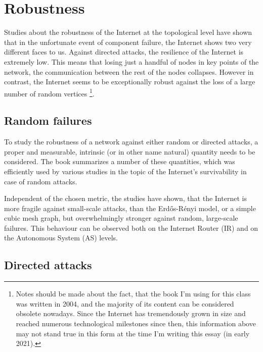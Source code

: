 \section{Robustness}
Studies about the robustness of the Internet at the topological level have shown that in the unfortunate event of component failure, the Internet shows two very different faces to us. Against directed attacks, the resilience of the Internet is extremely low. This means that losing just a handful of nodes in key points of the network, the communication between the rest of the nodes collapses. However in contrast, the Internet seems to be exceptionally robust against the loss of a large number of random vertices \footnote{Notes should be made about the fact, that the book I'm using for this class was written in 2004, and the majority of its content can be considered obsolete nowadays. Since the Internet has tremendously grown in size and reached numerous technological milestones since then, this information above may not stand true in this form at the time I'm writing this essay (in early 2021).}.

\subsection{Random failures}
To study the robustness of a network against either random or directed attacks, a proper and measurable, intrinsic (or in other name natural) quantity needs to be considered. The book summarizes a number of these quantities, which was efficiently used by various studies in the topic of the Internet's survivability in case of random attacks.

Independent of the chosen metric, the studies have shown, that the Internet is more fragile against small-scale attacks, than the Erdős-Rényi model, or a simple cubic mesh graph, but overwhelmingly stronger against random, large-scale failures. This behaviour can be observed both on the Internet Router (IR) and on the Autonomous System (AS) levels.

\subsection{Directed attacks}